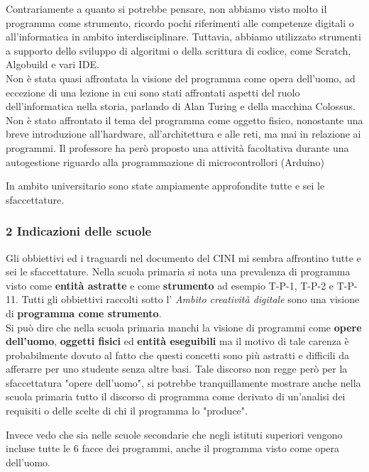 \documentclass[a4paper]{article}
\begin{document}
Contrariamente a quanto si potrebbe pensare, non abbiamo visto molto il programma come strumento, ricordo pochi riferimenti alle competenze digitali o all'informatica in ambito interdisciplinare. Tuttavia, abbiamo utilizzato strumenti a supporto dello sviluppo di algoritmi o della scrittura di codice, come Scratch, Algobuild e vari IDE.\\
Non è stata quasi affrontata la visione del programma come opera dell'uomo, ad eccezione di una lezione in cui sono stati affrontati aspetti del ruolo dell'informatica nella storia, parlando di Alan Turing e della macchina Colossus.
Non è stato affrontato il tema del programma come oggetto fisico, nonostante una breve introduzione all'hardware, all'architettura e alle reti, ma mai in relazione ai programmi.
Il professore ha però proposto una attività facoltativa durante una autogestione riguardo alla programmazione di microcontrollori (Arduino)


In ambito universitario sono state ampiamente approfondite tutte e sei le sfaccettature.
\subsubsection{2 Indicazioni delle scuole}
Gli obbiettivi ed i traguardi nel documento del CINI mi sembra affrontino tutte e sei le sfaccettature. Nella scuola primaria si nota una prevalenza di programma visto come \textbf{entità astratte} e come \textbf{strumento} ad esempio T-P-1, T-P-2 e T-P-11. Tutti gli obbiettivi raccolti sotto l' \textit{Ambito creatività digitale} sono una visione di \textbf{programma come strumento}.\\
Si può dire che nella scuola primaria manchi la visione di programmi come \textbf{opere dell'uomo}, \textbf{oggetti fisici} ed \textbf{entità eseguibili} ma il motivo di tale carenza è probabilmente dovuto al fatto che questi concetti sono più astratti e difficili da afferarre per uno studente senza altre basi. Tale discorso non regge però per la sfaccettatura "opere dell'uomo", si potrebbe tranquillamente mostrare anche nella scuola primaria tutto il discorso di programma come derivato di un’analisi dei requisiti o delle scelte di chi il programma lo "produce".


Invece vedo che sia nelle scuole secondarie che negli istituti superiori vengono incluse tutte le 6 facce dei programmi, anche il programma visto come opera dell'uomo.
\end{document}
